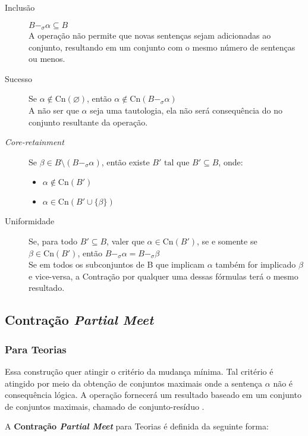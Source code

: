 \begin{description}
	\item[Inclusão] $ B -_{\sigma} \alpha \subseteq B$ \\ A operação não permite que novas sentenças sejam adicionadas ao conjunto, resultando em um conjunto com o mesmo número de sentenças ou menos.
	\item[Sucesso] Se $ \alpha \notin \text{Cn}(\varnothing) $, então $ \alpha \notin \text{Cn}(B -_{\sigma} \alpha) $ \\ A não ser que $ \alpha $ seja uma tautologia, ela não será consequência do no conjunto resultante da operação.
	\item[\textit{Core-retainment}] Se $ \beta \in B \setminus (B -_{\sigma} \alpha) $, então existe $ B' \text{ tal que } B' \subseteq B $, onde:
	\begin{itemize}
		\item $ \alpha \notin \text{Cn}(B') $
		\item $ \alpha \in \text{Cn}(B' \cup \{\beta\}) $ 
	\end{itemize}
	\item[Uniformidade] Se, para todo $ B' \subseteq B $, valer que $ \alpha \in \text{Cn}(B') $, se e somente se $ \beta \in \text{Cn}(B') $, então $ B -_{\sigma} \alpha = B -_{\sigma} \beta $ \\
	Se em todos os subconjuntos de B que implicam $ \alpha $ também for implicado $ \beta $ e vice-versa, a Contração por qualquer uma dessas fórmulas terá o mesmo resultado.
\end{description}

\subsection{Contração \textit{Partial Meet}}

\subsubsection{Para Teorias}

Essa construção quer atingir o critério da mudança mínima. Tal critério é atingido por meio da obtenção de conjuntos maximais onde a sentença $ \alpha $ não é consequência lógica. A operação fornecerá um resultado baseado em um conjunto de conjuntos maximais, chamado de conjunto-resíduo \citep{revisaoAGM}.

A \textbf{Contração \textit{Partial Meet}} para Teorias é definida da seguinte forma: 

